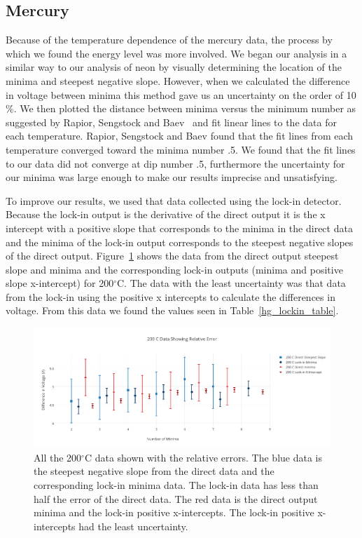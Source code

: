 \documentclass[prb,preprint]{revtex4-1}
\begin{document}
\subsection{Mercury}

Because of the temperature dependence of the mercury data, the process by which we found the energy level was more involved. We began our analysis in a similar way to our analysis of neon by visually determining the location of the minima and steepest negative slope. However, when we calculated the difference in voltage between minima this method gave us an uncertainty on the order of 10$\%$. We then plotted the distance between minima versus the minimum number as suggested by Rapior, Sengstock and Baev~\cite{newfeatures} and fit linear lines to the data for each temperature. Rapior, Sengstock and Baev found that the fit lines from each temperature converged toward the minima number .5. We found that the fit lines to our data did not converge at dip number .5, furthermore the uncertainty for our minima was large enough to make our results imprecise and unsatisfying.

To improve our results, we used that data collected using the lock-in detector. Because the lock-in output is the derivative of the direct output it is the x intercept with a positive slope that corresponds to the minima in the direct data and the minima of the lock-in output corresponds to the steepest negative slopes of the direct output. Figure~\ref{rel_error} shows the data from the direct output steepest slope and minima and the corresponding lock-in outputs (minima and positive slope x-intercept) for 200$^{\circ}$C. The data with the least uncertainty was that data from the lock-in using the positive x intercepts to calculate the differences in voltage. From this data we found the values seen in Table~\ref{hg_lockin_table}.

\begin{figure}[h!]
\centering

\includegraphics[width=6in]{rel_error.pdf}
\caption{All the 200$^{\circ}$C data shown with the relative errors. The blue data is the steepest negative slope from the direct data and the corresponding lock-in minima data. The lock-in data has less than half the error of the direct data. The red data is the direct output minima and the lock-in positive x-intercepts. The lock-in positive x-intercepts had the least uncertainty.}

\label{rel_error}
\end{figure}
\end{document}
